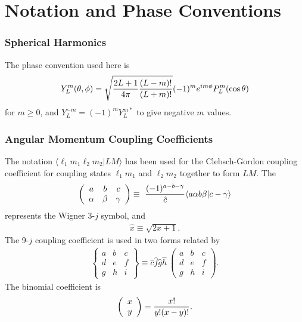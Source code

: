 \documentclass[11pt,a4paper]{article}
\begin{document}
\section{Notation and Phase Conventions}

\subsubsection*{Spherical Harmonics}
  The phase convention used here is
\begin{eqnarray} \nonumber
 Y_L^m ( \theta ,\phi ) =
  \sqrt {{ 2L+1 \over 4 \pi} {(L-m)! \over (L+m)!} } (-1)^m e^{im\phi}
  P_L^m ( \cos \theta )
\end{eqnarray}
for $ m \geq 0 $, and
$ Y_L^{-m} = (-1)^m Y_L^{m *}$
to give negative $ m$ values.
\subsubsection*{Angular Momentum Coupling Coefficients}

\newcommand{\baa}{\begin{array}{c}}
\newcommand{\bab}{\begin{array}{cc}}
\newcommand{\bac}{\begin{array}{ccc}}
\newcommand{\ea}{\end{array}}

The notation $\langle \ell_1 m_1 \ell_2 m_2 | LM\rangle $
has been used for the Clebsch-Gordon coupling coefficient
for coupling states $\ell_1 m_1 $ and
$\ell_2 m_2 $ together to form $LM.$
The
\begin{eqnarray} \nonumber
    \left ( \bac a&b&c\\ \alpha&\beta&\gamma \ea \right ) \equiv ~
        {(-1)^{a - b -\gamma} \over \hat c}
                    \langle a\alpha b \beta | c -\gamma\rangle
\end{eqnarray}
represents the Wigner 3-$j$ symbol, and
\begin{eqnarray} \nonumber
     \hat x \equiv \sqrt{2x+1}  .
\end{eqnarray}
The 9-$j$ coupling coefficient is used in two forms related by
\begin{eqnarray} \nonumber
   \left \{ \bac a&b&c\\d&e&f\\g&h&i \ea \right \}
      \equiv \hat c \hat f \hat g \hat h ~
   \left ( \bac a&b&c\\d&e&f\\g&h&i \ea \right ) .
\end{eqnarray}
The binomial coefficient is
\begin{eqnarray} \nonumber
\left ( \baa x \\ y \ea \right ) = {x! \over y!(x-y)!} .
\end{eqnarray}
\newpage
\end{document}
